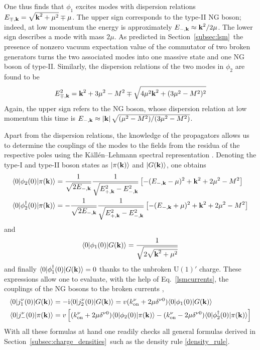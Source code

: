 \documentclass[final,3p,times,12pt,a4paper,sort&compress]{elsarticle}
\newcommand\gr[1]{\mathrm{#1}}              %
\newcommand\vek[1]{{\boldsymbol{\bf #1}}}   %
\newcommand\bra[1]{\langle#1\vert}          %
\newcommand\ket[1]{\vert#1\rangle}          %
\newcommand\he[1]{#1^{\dagger}}             %
\newcommand\imag{\mathrm i}                 %
\newcommand\abs[1]{\left|#1\right|}         %
\begin{document}
One thus finds that $\phi_1$ excites modes with dispersion relations
$E_{\mp,\vek k}=\sqrt{\vek k^2+\mu^2}\mp\mu$. The upper sign corresponds to the
type-II NG boson; indeed, at low momentum the energy is approximately $E_{-,\vek
k}\approx\vek k^2/2\mu$. The lower sign describes a mode with mass $2\mu$. As
predicted in Section~\ref{subsec:lsm}\ the presence of nonzero vacuum
expectation value of the commutator of two broken generators turns the two
associated modes into one massive state and one NG boson of type-II. Similarly,
the dispersion relations of the two modes in $\phi_2$ are found to be
\begin{equation}
E^2_{\mp,\vek k}=\vek k^2+3\mu^2-M^2\mp\sqrt{4\mu^2\vek k^2+(3\mu^2-M^2)^2}
\end{equation}
Again, the upper sign refers to the NG boson, whose dispersion relation at low
momentum this time is $E_{-,\vek k}\approx\abs{\vek
k}\sqrt{(\mu^2-M^2)/(3\mu^2-M^2)}$.

Apart from the dispersion relations, the knowledge of the propagators allows us
to determine the couplings of the modes to the fields from the residua of the
respective poles using the K\"all\'en--Lehmann spectral representation
\cite{Brauner:2006xm}. Denoting the type-I and type-II boson states as
$\ket{\pi(\vek k)}$ and $\ket{G(\vek k)}$, one obtains
\begin{equation}
\begin{split}
\bra0\phi_2(0)\ket{\pi(\vek k)}&=\frac1{\sqrt{2E_{-,\vek k}}}
\frac1{\sqrt{E_{+,\vek k}^2-E_{-,\vek k}^2}}
\left[-(E_{-,\vek k}-\mu)^2+\vek k^2+2\mu^2-M^2\right]\\
\bra0\he\phi_2(0)\ket{\pi(\vek k)}&=-\frac1{\sqrt{2E_{-,\vek k}}}
\frac1{\sqrt{E_{+,\vek k}^2-E_{-,\vek k}^2}}
\left[-(E_{-,\vek k}+\mu)^2+\vek k^2+2\mu^2-M^2\right]
\end{split}
\end{equation}
and
\begin{equation}
\bra0\phi_1(0)\ket{G(\vek k)}=\frac1{\sqrt{2\sqrt{\vek k^2+\mu^2}}}
\end{equation}
and finally $\bra0\he\phi_1(0)\ket{G(\vek k)}=0$ thanks to the unbroken
$\gr{U(1)}'$ charge. These expressions allow one to evaluate, with the
help of Eq.~\eqref{lsmcurrents}, the couplings of the NG bosons to the broken
currents \cite{Brauner:2007uw},
\begin{equation}
\begin{split}
\bra0j_1^\nu(0)\ket{G(\vek k)}&=-\imag\bra0j_2^\nu(0)\ket{G(\vek k)}=
v(k^\nu_{\text{on}}+2\mu\delta^{\nu0})\bra0\phi_1(0)\ket{G(\vek k)}\\
\bra0j_-^\nu(0)\ket{\pi(\vek k)}&=v\left[(k^\nu_{\text{on}}+2\mu\delta^{\nu0})
\bra0\phi_2(0)\ket{\pi(\vek k)}-(k^\nu_{\text{on}}-2\mu\delta^{\nu0})
\bra0\he\phi_2(0)\ket{\pi(\vek k)}\right]
\end{split}
\end{equation}
With all these formulas at hand one readily checks all general formulas derived
in Section~\ref{subsec:charge_densities}\ such as the density rule
\eqref{density_rule}.
\end{document}
